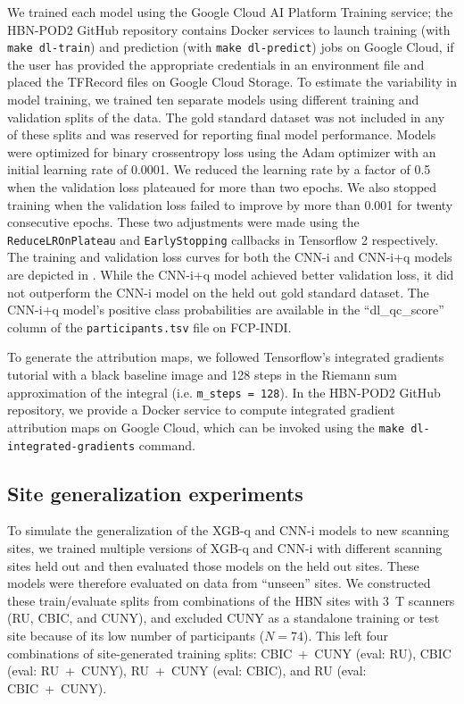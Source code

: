 \documentclass[9pt,lineno]{elife}
\begin{document}
We trained each model using the Google Cloud AI Platform Training service;
the HBN-POD2 GitHub repository contains Docker services to launch training (with
\texttt{make dl-train}) and prediction (with \texttt{make dl-predict}) jobs on
Google Cloud, if the user has provided the appropriate credentials in an
environment file and placed the TFRecord files on Google Cloud Storage. To
estimate the variability in model training, we trained ten separate models using
different training and validation splits of the data. The gold standard dataset
was not included in any of these splits and was reserved for reporting final
model performance. Models were optimized for binary crossentropy loss using the
Adam optimizer \citep{kingma2017adam} with an initial learning rate of 0.0001. We
reduced the learning rate by a factor of 0.5 when the validation loss plateaued
for more than two epochs. We also stopped training when the validation loss
failed to improve by more than 0.001 for twenty consecutive epochs. These two
adjustments were made using the \texttt{ReduceLROnPlateau} and
\texttt{EarlyStopping} callbacks in Tensorflow 2 \citep{tensorflow} respectively.
The training and validation loss curves for both the CNN-i and CNN-i+q models
are depicted in . While the CNN-i+q model achieved
better validation loss, it did not outperform the CNN-i model on the held out
gold standard dataset. The CNN-i+q model's positive class probabilities are
available in the ``dl\_qc\_score'' column of the \texttt{participants.tsv} file on
FCP-INDI.

To generate the attribution maps, we followed Tensorflow's integrated gradients
tutorial \citep{integrated-gradients-tutorial} with a black baseline image and
128 steps in the Riemann sum approximation of the integral (i.e.
\texttt{m\_steps = 128}). In the HBN-POD2 GitHub repository, we provide a Docker
service to compute integrated gradient attribution maps on Google Cloud, which
can be invoked using the \texttt{make dl-integrated-gradients} command.

\subsection{Site generalization experiments}

To simulate the generalization of the XGB-q and CNN-i models to new scanning sites, we trained multiple versions of XGB-q and CNN-i with different scanning sites held out and then evaluated those models on the held out sites. These models were therefore evaluated on data from ``unseen'' sites. We constructed these train/evaluate splits from combinations of the HBN sites with \qty{3}{\tesla} scanners (RU, CBIC, and CUNY), and excluded CUNY as a standalone training or test site because of its low number of participants ($N=74$). This left four combinations of site-generated training splits: CBIC~+~CUNY (eval: RU), CBIC (eval: RU~+~CUNY), RU~+~CUNY (eval: CBIC), and RU (eval: CBIC~+~CUNY).
\end{document}
